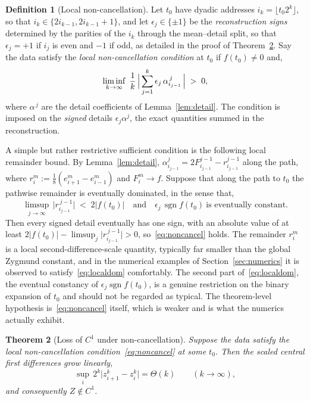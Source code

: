 \documentclass{article}
\theoremstyle{plain}
\newtheorem{theorem}{Theorem}[section]
\theoremstyle{definition}
\newtheorem{definition}[theorem]{Definition}
\newcommand{\abs}[1]{\lvert #1 \rvert}
\begin{document}
\begin{definition}[Local non-cancellation]\label{def:noncancel}
Let $t_0$ have dyadic addresses $i_k=\lfloor t_0 2^k\rfloor$, so that
$i_k\in\{2i_{k-1},2i_{k-1}+1\}$, and let $\epsilon_j\in\{\pm1\}$ be the
\emph{reconstruction signs} determined by the parities of the $i_k$ through the
mean--detail split, so that $\epsilon_j=+1$ if $i_j$ is even and $-1$ if odd, as
detailed in the proof of Theorem~\ref{thm:nonC1}. Say the data satisfy the
\emph{local non-cancellation condition} at $t_0$ if $f(t_0)\neq0$ and,
\begin{equation}\label{eq:noncancel}
  \liminf_{k\to\infty}\;\frac1k\,\Bigl\lvert\,\sum_{j=1}^{k}\epsilon_j\,\alpha_{i_{j-1}}^{\,j}\,\Bigr\rvert
  \;>\;0,
\end{equation}
where $\alpha^{\,j}$ are the detail coefficients of Lemma~\ref{lem:detail}. The
condition is imposed on the \emph{signed} details $\epsilon_j\alpha^j$, the exact
quantities summed in the reconstruction.

A simple but rather restrictive sufficient condition is the following local
remainder bound. By Lemma~\ref{lem:detail}, $\alpha_{i_{j-1}}^{j}
=2F_{i_{j-1}}^{j-1}-r_{i_{j-1}}^{j-1}$ along the path, where
$r_i^{m}:=\tfrac18(e_{i+1}^{m}-e_{i-1}^{m})$ and $F_i^{m}\to f$. Suppose that
along the path to $t_0$ the pathwise remainder is eventually dominated, in the
sense that,
\begin{equation}\label{eq:localdom}
  \limsup_{j\to\infty}\,\abs{r_{i_{j-1}}^{\,j-1}}\;<\;2\abs{f(t_0)}
  \quad\text{and}\quad
  \epsilon_j\,\operatorname{sgn} f(t_0)\ \text{is eventually constant.}
\end{equation}
Then every signed detail eventually has one sign, with an absolute value of at least
$2\abs{f(t_0)}-\limsup_j\abs{r_{i_{j-1}}^{\,j-1}}>0$, so~\eqref{eq:noncancel}
holds. The remainder $r_i^{m}$ is a local second-difference-scale quantity,
typically far smaller than the global Zygmund constant, and in the numerical
examples of Section~\ref{sec:numerics} it is observed to
satisfy~\eqref{eq:localdom} comfortably. The second part of~\eqref{eq:localdom},
the eventual constancy of $\epsilon_j\operatorname{sgn}f(t_0)$, is a genuine
restriction on the binary expansion of $t_0$ and should not be regarded as
typical. The theorem-level hypothesis is~\eqref{eq:noncancel} itself, which is
weaker and is what the numerics actually exhibit.
\end{definition}

\begin{theorem}[Loss of $C^1$ under non-cancellation]\label{thm:nonC1}
Suppose the data satisfy the local non-cancellation
condition~\eqref{eq:noncancel} at some $t_0$. Then the scaled central first
differences grow linearly,
\begin{equation}\label{eq:lineargrowth}
  \sup_i\,2^k\abs{z_{i+1}^k-z_i^k}=\Theta(k)\qquad(k\to\infty),
\end{equation}
and consequently $Z\notin C^1$.
\end{theorem}
\end{document}
